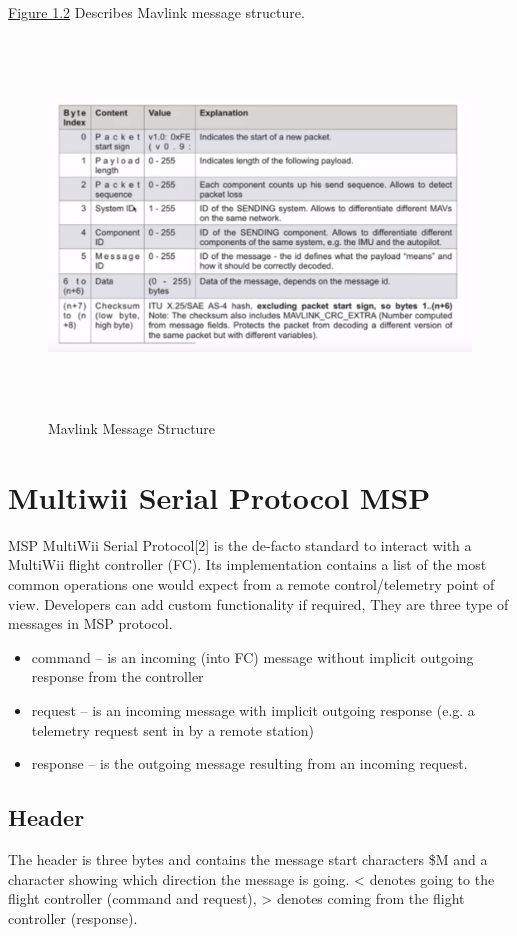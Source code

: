 \hyperref[fig:Mavlinkmessage]{Figure 1.2} Describes Mavlink message structure. 
 \begin{figure}[H]
\includegraphics[width=15cm,height=10cm]{images/2.png}
\caption{Mavlink Message Structure }
\label{fig:Mavlinkmessage}
\end{figure}

\cleardoublepage



\section{Multiwii Serial Protocol MSP}

MSP MultiWii Serial Protocol[2] is the de-facto standard to interact with a MultiWii flight controller (FC). Its implementation contains a list of the most common operations one would expect from a remote control/telemetry point of view. Developers can add custom functionality if required,
They are three type of messages in MSP protocol. 
\begin{itemize}
  \item  command – is an incoming (into FC) message without implicit outgoing response from the controller
  \item  request –  is an incoming message with implicit outgoing response (e.g. a telemetry request sent in by a remote station)
  \item  response – is the outgoing message resulting from an incoming request. 
\end{itemize}

\subsection{Header}
The header is three bytes and contains the message start characters \$M and a character showing which direction the message is going. <  denotes going to the flight controller (command and request), > denotes coming from the flight controller (response).

